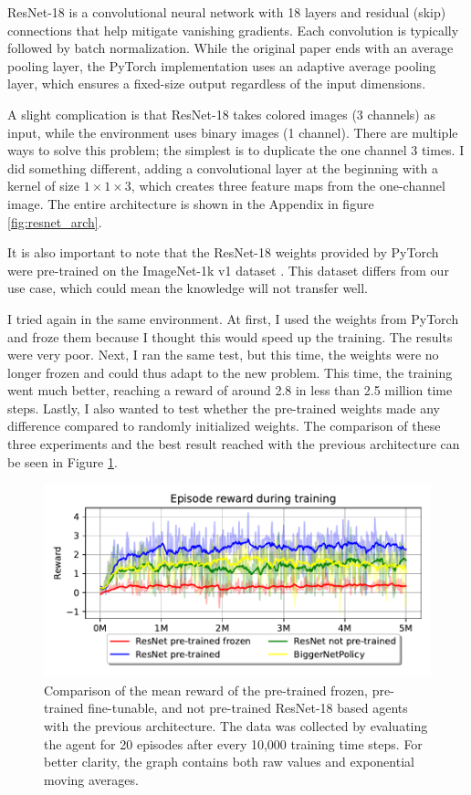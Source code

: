 \documentclass[
  digital,     %
  oneside,     %
  nosansbold,  %
  nocolorbold, %
  lof,         %
  lot,         %
]{fithesis4}
\begin{document}
ResNet-18 is a convolutional neural network with 18 layers and residual (skip) connections that help mitigate vanishing gradients. Each convolution is typically followed by batch normalization. While the original paper ends with an average pooling layer, the PyTorch implementation uses an adaptive average pooling layer, which ensures a fixed-size output regardless of the input dimensions.

A slight complication is that ResNet-18 takes colored images (3 channels) as input, while the environment uses binary images (1 channel). There are multiple ways to solve this problem; the simplest is to duplicate the one channel 3 times. I did something different, adding a convolutional layer at the beginning with a kernel of size $1\times1\times3$, which creates three feature maps from the one-channel image. The entire architecture is shown in the Appendix in figure \ref{fig:resnet_arch}.

It is also important to note that the ResNet-18 weights provided by PyTorch were pre-trained on the ImageNet-1k v1 dataset \cite{torchvision2016}. This dataset differs from our use case, which could mean the knowledge will not transfer well.

I tried again in the same environment. At first, I used the weights from PyTorch and froze them because I thought this would speed up the training. The results were very poor. Next, I ran the same test, but this time, the weights were no longer frozen and could thus adapt to the new problem. This time, the training went much better, reaching a reward of around 2.8 in less than 2.5 million time steps. Lastly, I also wanted to test whether the pre-trained weights made any difference compared to randomly initialized weights. The comparison of these three experiments and the best result reached with the previous architecture can be seen in Figure \ref{fig:v4_resnet_graph}. 

\begin{figure}
    \includegraphics[width=1\linewidth]{graphs/v4_resnet_graph.pdf}
    \caption{Comparison of the mean reward of the pre-trained frozen, pre-trained fine-tunable, and not pre-trained ResNet-18 based agents with the previous architecture. The data was collected by evaluating the agent for 20 episodes after every 10,000 training time steps. For better clarity, the graph contains both raw values and exponential moving averages.}
    \label{fig:v4_resnet_graph}
\end{figure}
\end{document}
